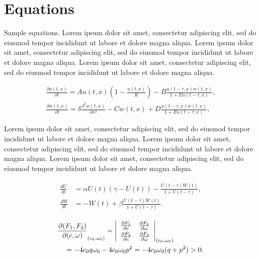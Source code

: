 \documentclass[
  journal=kielnarowa,
  year=2024,
  volume=1,
]{cup-journal}
\begin{document}
\section{Equations}

Sample equations. Lorem ipsum dolor sit amet, consectetur adipiscing elit, sed do eiusmod tempor incididunt ut labore et dolore magna aliqua. Lorem ipsum dolor sit amet, consectetur adipiscing elit, sed do eiusmod tempor incididunt ut labore et dolore magna aliqua. Lorem ipsum dolor sit amet, consectetur adipiscing elit, sed do eiusmod tempor incididunt ut labore et dolore magna aliqua. 


\begin{equation}
\begin{aligned}\label{eq:first}
\frac{\partial u(t,x)}{\partial t} = Au(t,x) \left(1-\frac{u(t,x)}{K}\right)
 -B\frac{u(t-\tau,x) w(t,x)}{1+Eu(t-\tau,x)},\\
\frac{\partial w(t,x)}{\partial t} =\delta \frac{\partial^2w(t,x)}{\partial x^2}-Cw(t,x)
+D\frac{u(t-\tau,x)w(t,x)}{1+Eu(t-\tau,x)},
\end{aligned}
\end{equation}

 Lorem ipsum dolor sit amet, consectetur adipiscing elit, sed do eiusmod tempor incididunt ut labore et dolore magna aliqua. Lorem ipsum dolor sit amet, consectetur adipiscing elit, sed do eiusmod tempor incididunt ut labore et dolore magna aliqua. Lorem ipsum dolor sit amet, consectetur adipiscing elit, sed do eiusmod tempor incididunt ut labore et dolore magna aliqua. 

\begin{align}\label{eq:another}
\begin{split}
\frac{dU}{dt} &=\alpha U(t)(\gamma -U(t))-\frac{U(t-\tau)W(t)}{1+U(t-\tau)},\\
\frac{dW}{dt} &=-W(t)+\beta\frac{U(t-\tau)W(t)}{1+U(t-\tau)}.
\end{split}
\end{align}


\begin{align*}
&\frac{\partial(F_1,F_2)}{\partial(c,\omega)}_{(c_0,\omega_0)} = \left|
\begin{array}{ll}
\frac{\partial F_1}{\partial c} &\frac{\partial F_1}{\partial \omega} \\\noalign{\vskip3pt}
\frac{\partial F_2}{\partial c}&\frac{\partial F_2}{\partial \omega}
\end{array}\right|_{(c_0,\omega_0)}\\
&\quad=-4c_0q\omega_0 -4c_0\omega_0p^2 =-4c_0\omega_0(q+p^2)>0.
\end{align*}
\end{document}
